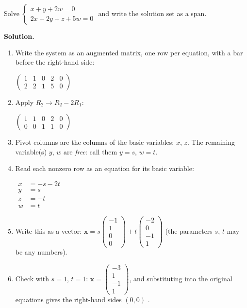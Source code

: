 \documentclass[11pt]{article}
\begin{document}
\begin{tcolorbox}[breakable,colback=white,colframe=ink!60,title={\bfseries Example 5 \textperiodcentered\ A homogeneous system}]Solve $\begin{cases}x+y+2w=0\\ 2x+2y+z+5w=0\end{cases}$ and write the solution set as a span.
\par\smallskip
\textbf{Solution.} \begin{enumerate}[leftmargin=1.6em,itemsep=1pt,topsep=2pt,label=\arabic*.]\item Write the system as an augmented matrix, one row per equation, with a bar before the right-hand side:\par\smallskip $\displaystyle \left(\begin{array}{cccc|c}1 & 1 & 0 & 2 & 0 \\ 2 & 2 & 1 & 5 & 0\end{array}\right)$
\item Apply $R_2\to R_2-2R_1$:\par\smallskip $\displaystyle \left(\begin{array}{cccc|c}1 & 1 & 0 & 2 & 0 \\ 0 & 0 & 1 & 1 & 0\end{array}\right)$
\item Pivot columns are the columns of the basic variables: $x$, $z$. The remaining variable(s) $y$, $w$ are \emph{free}: call them $y=s$, $w=t$.
\item Read each nonzero row as an equation for its basic variable:\par\smallskip $\displaystyle\begin{aligned}x&=-s-2t\\ y&=s\\ z&=-t\\ w&=t\end{aligned}$
\item Write this as a vector: $\displaystyle \mathbf x=s\begin{pmatrix}-1\\1\\0\\0\end{pmatrix}+t\begin{pmatrix}-2\\0\\-1\\1\end{pmatrix}$ (the parameters $s$, $t$ may be any numbers).
\item Check with $s=1$, $t=1$: $\mathbf x=\begin{pmatrix}-3\\1\\-1\\1\end{pmatrix}$, and substituting into the original equations gives the right-hand sides $(0,0)$ \checkmark.

\end{enumerate}
\end{tcolorbox}
\end{document}
